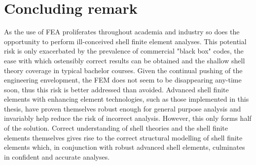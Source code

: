 \section{Concluding remark}

As the use of FEA proliferates throughout academia and industry so does the opportunity to perform ill-conceived shell finite element analyses. This potential risk is only exacerbated by the prevalence of commercial "black box" codes, the ease with which ostensibly correct results can be obtained and the shallow shell theory coverage in typical bachelor courses. Given the continual pushing of the engineering envelopment, the FEM does not seem to be disappearing any-time soon, thus this risk is better addressed than avoided. Advanced shell finite elements with enhancing element technologies, such as those implemented in this thesis, have proven themselves robust enough for general purpose analysis and invariably help reduce the risk of incorrect analysis. However, this only forms half of the solution. Correct understanding of shell theories and the shell finite elements themselves gives rise to the correct structural modelling of shell finite elements which, in conjunction with robust advanced shell elements, culminates in confident and accurate analyses.